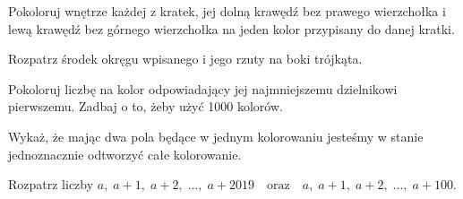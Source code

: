 
\begin{hints_list}
	\item *
	\item Pokoloruj wnętrze każdej z kratek, jej dolną krawędź bez prawego wierzchołka i lewą krawędź bez górnego wierzchołka na jeden kolor przypisany do danej kratki.
	\item Rozpatrz środek okręgu wpisanego i jego rzuty na boki trójkąta.
	\item Pokoloruj liczbę na kolor odpowiadający jej najmniejszemu dzielnikowi pierwszemu. Zadbaj o to, żeby użyć 1000 kolorów.
	\item Wykaż, że mając dwa pola będące w jednym kolorowaniu jesteśmy w stanie jednoznacznie odtworzyć całe kolorowanie.
	\item Rozpatrz liczby $a,\; a + 1,\; a + 2,\; ...,\; a + 2019 \quad \text{oraz} \quad
	a,\; a + 1,\; a + 2,\; ..., \; a + 100.$
\end{hints_list}